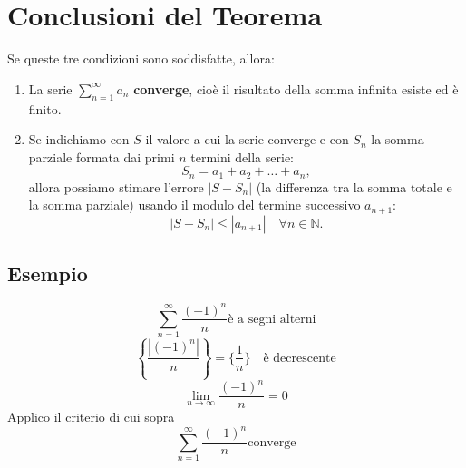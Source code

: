 \documentclass{article}
\begin{document}
\section*{Conclusioni del Teorema}

Se queste tre condizioni sono soddisfatte, allora:

\begin{enumerate}
    \item La serie \(\sum_{n=1}^\infty a_n\) \textbf{converge}, cioè il risultato della somma infinita esiste ed è finito.
    
    \item Se indichiamo con \( S \) il valore a cui la serie converge e con \( S_n \) la somma parziale formata dai primi \( n \) termini della serie:
    \[
    S_n = a_1 + a_2 + \dots + a_n,
    \]
    allora possiamo stimare l'errore \( |S - S_n| \) (la differenza tra la somma totale e la somma parziale) usando il modulo del termine successivo \( a_{n+1} \):
    \[
    |S - S_n| \leq |a_{n+1}| \quad \forall n \in \mathbb{N}.
    \]
\end{enumerate}

\subsection{Esempio}
\[
    \sum_{n=1} ^{\infty} \frac{(-1)^n}{n} \text{è a segni alterni}
\]
\[
\left\{\frac{\left|(-1)^n\right|}{n}\right\} = \{ \frac{1}{n}\} \quad\text{è decrescente}
\]
\[
    \lim _{n\to \infty} \frac{(-1)^n}{n} =0
\]
Applico il criterio di cui sopra 
\[
    \sum_{n=1} ^{\infty} \frac{(-1)^n}{n} \text{converge}
\]
\end{document}
